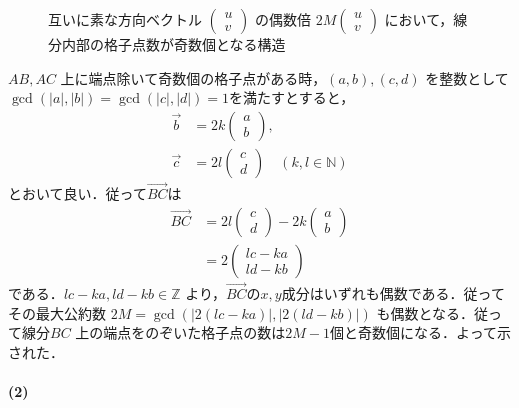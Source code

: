 \documentclass[../../main.tex]{subfiles}
\begin{document}
\begin{figure}[htb]
\begin{tikzpicture}[scale=1.5, >=stealth, every node/.style={font=\small}]
  \end{tikzpicture}
  \caption{互いに素な方向ベクトル $
    \begin{pmatrix}u\\v
    \end{pmatrix}$ の偶数倍 $2M
    \begin{pmatrix}u\\v
  \end{pmatrix}$ において，線分内部の格子点数が奇数個となる構造}
  \label{fig:even_vector_odd_lattice_points}
\end{figure}

$AB, AC$ 上に端点除いて奇数個の格子点がある時，$(a,b), (c,d)$ を整数として
$\gcd(|a|,|b|)=\gcd(|c|,|d|)=1$を満たすとすると，
\begin{align}
  \vec{b} &= 2k
  \begin{pmatrix} a \\ b
  \end{pmatrix}, \\
  \vec{c} &= 2l
  \begin{pmatrix} c \\ d
  \end{pmatrix} \quad (k, l \in \mathbb{N})
\end{align}
とおいて良い．従って$\overrightarrow{BC}$は
\begin{align}
  \overrightarrow{BC} &= 2l
  \begin{pmatrix} c \\ d
  \end{pmatrix} - 2k
  \begin{pmatrix} a \\ b
  \end{pmatrix} \\
  &= 2
  \begin{pmatrix} lc - ka \\ ld - kb
  \end{pmatrix}
\end{align}
である．$lc - ka, ld - kb \in \mathbb{Z}$ より，$\overrightarrow{BC}$の$x,y$成分はいずれも偶数である．従ってその最大公約数 $2M = \gcd(|2(lc-ka)|,|2(ld-kb)|)$ も偶数となる．従って線分$BC$ 上の端点をのぞいた格子点の数は$2M-1$個と奇数個になる．よって示された．

\paragraph{(2)}
\end{document}
